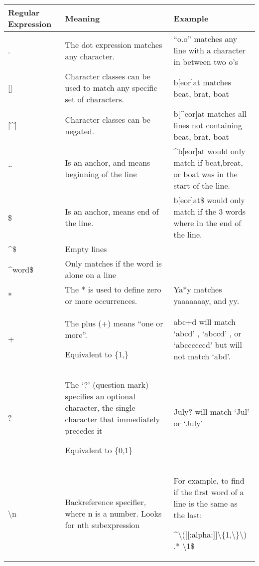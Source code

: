 \begin{longtable}[]{@{}lll@{}}
\toprule
Regular Expression & Meaning & Example\tabularnewline
\midrule
\endhead
. & The dot expression matches any character. & ``o.o'' matches any line
with a character in between two o's\tabularnewline
{[}{]} & Character classes can be used to match any specific set of
characters. & b{[}eor{]}at matches beat, brat, boat\tabularnewline
{[}\^{}{]} & Character classes can be negated. & b{[}\^{}eor{]}at
matches all lines not containing beat, brat, boat\tabularnewline
\^{} & Is an anchor, and means beginning of the line & \^{}b{[}eor{]}at
would only match if beat,breat, or boat was in the start of the
line.\tabularnewline
\$ & Is an anchor, means end of the line. & b{[}eor{]}at\$ would only
match if the 3 words where in the end of the line.\tabularnewline
\^{}\$ & Empty lines &\tabularnewline
\^{}word\$ & Only matches if the word is alone on a line
&\tabularnewline
* & The * is used to define zero or more occurrences. & Ya*y matches
yaaaaaaay, and yy.\tabularnewline
\begin{minipage}[t]{0.30\columnwidth}\raggedright
+\strut
\end{minipage} & \begin{minipage}[t]{0.30\columnwidth}\raggedright
The plus (+) means ``one or more''.

Equivalent to \{1,\}\strut
\end{minipage} & \begin{minipage}[t]{0.30\columnwidth}\raggedright
abc+d will match `abcd' , `abccd' , or `abccccccd' but will not match
`abd'.\strut
\end{minipage}\tabularnewline
\begin{minipage}[t]{0.30\columnwidth}\raggedright
?\strut
\end{minipage} & \begin{minipage}[t]{0.30\columnwidth}\raggedright
The `?' (question mark) specifies an optional character, the single
character that immediately precedes it

Equivalent to \{0,1\}\strut
\end{minipage} & \begin{minipage}[t]{0.30\columnwidth}\raggedright
July? will match `Jul' or `July'\strut
\end{minipage}\tabularnewline
\begin{minipage}[t]{0.30\columnwidth}\raggedright
\textbackslash{}n\strut
\end{minipage} & \begin{minipage}[t]{0.30\columnwidth}\raggedright
Backreference specifier, where n is a number. Looks for nth
subexpression\strut
\end{minipage} & \begin{minipage}[t]{0.30\columnwidth}\raggedright
For example, to find if the first word of a line is the same as the
last:

\^{}\textbackslash{}({[}{[}:alpha:{]}{]}\textbackslash{}\{1,\textbackslash{}\}\textbackslash{})
.* \textbackslash{}1\$\strut
\end{minipage}\tabularnewline
\bottomrule
\end{longtable}

